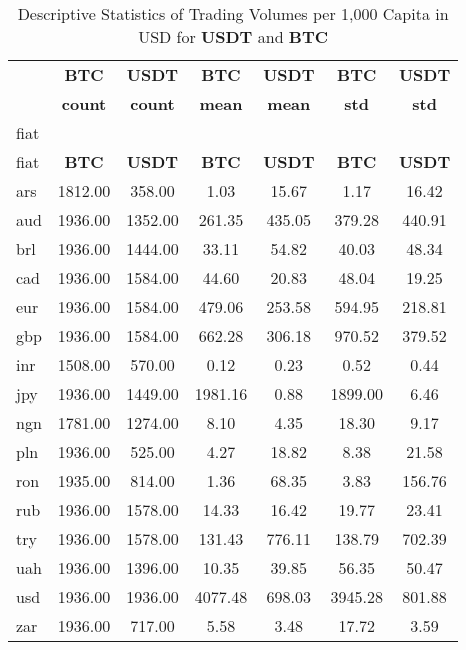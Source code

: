 \begin{table}
\caption{Descriptive Statistics of Trading Volumes per 1,000 Capita in USD for \textbf{USDT} and \textbf{BTC}}
\label{tab:descriptive_stats}
\begin{tabular}{lcccccc}
\toprule
\toprule
 & \textbf{BTC} & \textbf{USDT} & \textbf{BTC} & \textbf{USDT} & \textbf{BTC} & \textbf{USDT} \\
 & \textbf{count} & \textbf{count} & \textbf{mean} & \textbf{mean} & \textbf{std} & \textbf{std} \\
fiat &  &  &  &  &  &  \\
\midrule
fiat & \textbf{BTC} & \textbf{USDT} & \textbf{BTC} & \textbf{USDT} & \textbf{BTC} & \textbf{USDT} \\
ars & 1812.00 & 358.00 & 1.03 & 15.67 & 1.17 & 16.42 \\
aud & 1936.00 & 1352.00 & 261.35 & 435.05 & 379.28 & 440.91 \\
brl & 1936.00 & 1444.00 & 33.11 & 54.82 & 40.03 & 48.34 \\
cad & 1936.00 & 1584.00 & 44.60 & 20.83 & 48.04 & 19.25 \\
eur & 1936.00 & 1584.00 & 479.06 & 253.58 & 594.95 & 218.81 \\
gbp & 1936.00 & 1584.00 & 662.28 & 306.18 & 970.52 & 379.52 \\
inr & 1508.00 & 570.00 & 0.12 & 0.23 & 0.52 & 0.44 \\
jpy & 1936.00 & 1449.00 & 1981.16 & 0.88 & 1899.00 & 6.46 \\
ngn & 1781.00 & 1274.00 & 8.10 & 4.35 & 18.30 & 9.17 \\
pln & 1936.00 & 525.00 & 4.27 & 18.82 & 8.38 & 21.58 \\
ron & 1935.00 & 814.00 & 1.36 & 68.35 & 3.83 & 156.76 \\
rub & 1936.00 & 1578.00 & 14.33 & 16.42 & 19.77 & 23.41 \\
try & 1936.00 & 1578.00 & 131.43 & 776.11 & 138.79 & 702.39 \\
uah & 1936.00 & 1396.00 & 10.35 & 39.85 & 56.35 & 50.47 \\
usd & 1936.00 & 1936.00 & 4077.48 & 698.03 & 3945.28 & 801.88 \\
zar & 1936.00 & 717.00 & 5.58 & 3.48 & 17.72 & 3.59 \\
\bottomrule
\bottomrule
\end{tabular}
\end{table}
